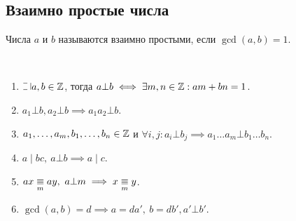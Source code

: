 \subsection{Взаимно простые числа}

\begin{defn}
    Числа $a$ и $b$ называются взаимно простыми, если $\gcd(a, b) = 1$.
\end{defn}

\begin{theorem-non}~
    \begin{enumerate}
        \item $\letus a, b \in \Z$, тогда $a \bot b \iff \exists m, n \in \mathbb{Z}: am + bn = 1$.
        
        \item $a_1 \bot b, a_2 \bot b \implies a_1a_2 \bot b$.
        
        \item $a_1, \ldots, a_m, b_1, \ldots, b_n \in \mathbb{Z}$ и $\forall i, j: a_i \bot b_j \implies a_1 \ldots a_m \bot b_1 \ldots b_n$.
        
        \item $a \mid bc,~a \bot b \implies a \mid c$.
        
        \item $ax \underset{m}{\equiv} ay,~a \bot m \implies x \underset{m}{\equiv} y$.
        
        \item $\gcd(a, b) = d \implies a = da',~b = db', a' \bot b'$.
    \end{enumerate}
\end{theorem-non}

